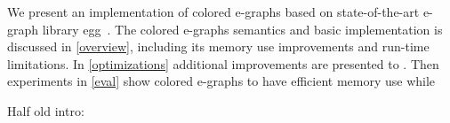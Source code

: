 We present an implementation of colored e-graphs based on state-of-the-art e-graph library egg~\cite{egg}.
The colored e-graphs semantics and basic implementation is discussed in \autoref{overview}, including its memory use improvements and run-time limitations.
In \autoref{optimizations} additional improvements are presented to .
Then experiments in \autoref{eval} show colored e-graphs to have efficient memory use while 

\begin{comment}
Multiple challenges present themselves when attempting to make these modifications to state-of-the-art e-graph implementations such as egg~\cite{egg}.
\SI{I think this paragraph and the list are no longer needed here because we have a better explanation in II}
 Normally, E-Graphs are built using a few key data structures that have been shown to be critical to the
effective performance of e-graphs:
\begin{enumerate}
  \item A union-find data structure for
      maintaining the set of equivalence classes
      that are created by non-destructive
      rewrite operations.
      Such rewrites are run frequently, making
      performance of the above significant.
  \item A hash table (hashcons) that maps e-nodes (AST nodes of terms in the e-graph) to their equality classes
  \item Collection of nodes for each equivalence class used for E-Matching
  \item A list of parents used for congruence closure
\end{enumerate}
To be efficient in memory usage, each color should only hold it's union find, but that leaves the open question on how to implement E-Matching, Rebuild, and Add. 

\ES{We are missing contrubutions, results and maybe some conclusion}

\end{comment}



Half old intro:

